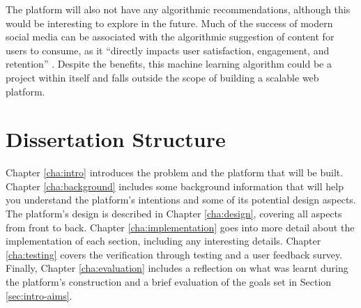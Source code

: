 The platform will also not have any algorithmic recommendations, although this would be interesting to explore in the future.
Much of the success of modern social media can be associated with the algorithmic suggestion of content for users to consume, as it ``directly impacts user satisfaction, engagement, and retention'' \citep{chen2024algocontent}. 
Despite the benefits, this machine learning algorithm could be a project within itself and falls outside the scope of building a scalable web platform.

\section{Dissertation Structure}
\label{sec:intro-structure}
Chapter \ref{cha:intro} introduces the problem and the platform that will be built.
Chapter \ref{cha:background} includes some background information that will help you understand the platform's intentions and some of its potential design aspects.
The platform's design is described in Chapter \ref{cha:design}, covering all aspects from front to back.
Chapter \ref{cha:implementation} goes into more detail about the implementation of each section, including any interesting details.
Chapter \ref{cha:testing} covers the verification through testing and a user feedback survey.
Finally, Chapter \ref{cha:evaluation} includes a reflection on what was learnt during the platform's construction and a brief evaluation of the goals set in Section \ref{sec:intro-aims}.
